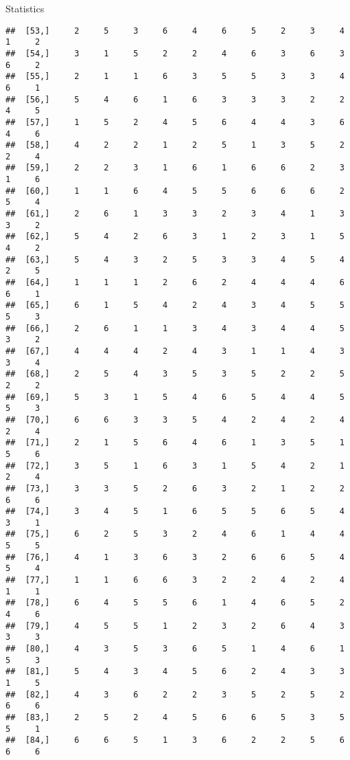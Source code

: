 \documentclass[
  ignorenonframetext,
]{beamer}
\begin{document}
\begin{frame}[fragile]{Statistics}
\begin{verbatim}
##  [53,]     2     5     3     6     4     6     5     2     3     4     1     2
##  [54,]     3     1     5     2     2     4     6     3     6     3     6     2
##  [55,]     2     1     1     6     3     5     5     3     3     4     6     1
##  [56,]     5     4     6     1     6     3     3     3     2     2     4     5
##  [57,]     1     5     2     4     5     6     4     4     3     6     4     6
##  [58,]     4     2     2     1     2     5     1     3     5     2     2     4
##  [59,]     2     2     3     1     6     1     6     6     2     3     1     6
##  [60,]     1     1     6     4     5     5     6     6     6     2     5     4
##  [61,]     2     6     1     3     3     2     3     4     1     3     3     2
##  [62,]     5     4     2     6     3     1     2     3     1     5     4     2
##  [63,]     5     4     3     2     5     3     3     4     5     4     2     5
##  [64,]     1     1     1     2     6     2     4     4     4     6     6     1
##  [65,]     6     1     5     4     2     4     3     4     5     5     5     3
##  [66,]     2     6     1     1     3     4     3     4     4     5     3     2
##  [67,]     4     4     4     2     4     3     1     1     4     3     3     4
##  [68,]     2     5     4     3     5     3     5     2     2     5     2     2
##  [69,]     5     3     1     5     4     6     5     4     4     5     5     3
##  [70,]     6     6     3     3     5     4     2     4     2     4     2     4
##  [71,]     2     1     5     6     4     6     1     3     5     1     5     6
##  [72,]     3     5     1     6     3     1     5     4     2     1     2     4
##  [73,]     3     3     5     2     6     3     2     1     2     2     6     6
##  [74,]     3     4     5     1     6     5     5     6     5     4     3     1
##  [75,]     6     2     5     3     2     4     6     1     4     4     5     5
##  [76,]     4     1     3     6     3     2     6     6     5     4     5     4
##  [77,]     1     1     6     6     3     2     2     4     2     4     1     1
##  [78,]     6     4     5     5     6     1     4     6     5     2     4     6
##  [79,]     4     5     5     1     2     3     2     6     4     3     3     3
##  [80,]     4     3     5     3     6     5     1     4     6     1     5     3
##  [81,]     5     4     3     4     5     6     2     4     3     3     1     5
##  [82,]     4     3     6     2     2     3     5     2     5     2     6     6
##  [83,]     2     5     2     4     5     6     6     5     3     5     5     1
##  [84,]     6     6     5     1     3     6     2     2     5     6     6     6

\end{verbatim}
\end{frame}
\end{document}
